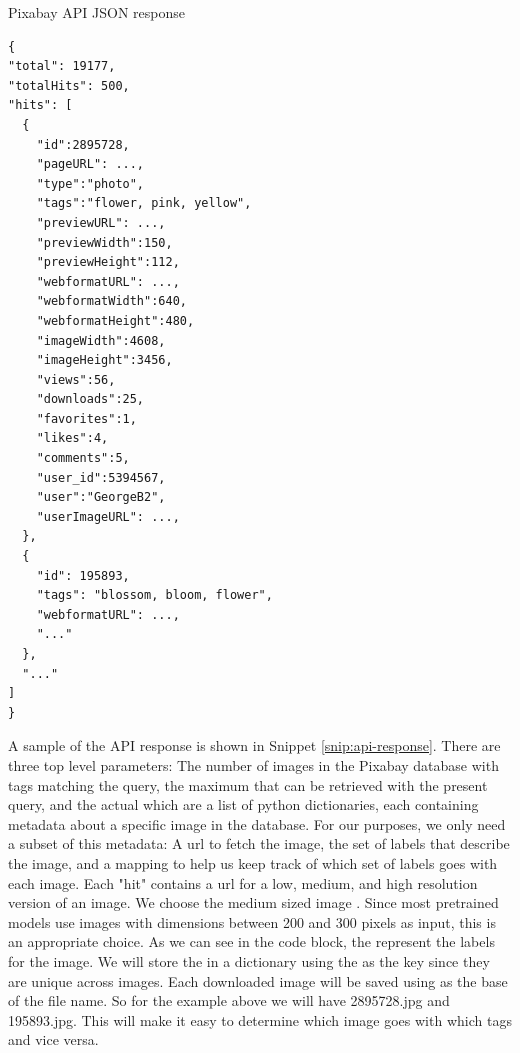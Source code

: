 \documentclass[10pt, a4paper, twocolumn]{article} %
\begin{document}
\begin{code}
\caption{Pixabay API JSON response}
\label{snip:api-response}
\begin{verbatim}
{
"total": 19177,
"totalHits": 500,
"hits": [
  {
    "id":2895728,
    "pageURL": ...,
    "type":"photo",
    "tags":"flower, pink, yellow",
    "previewURL": ...,
    "previewWidth":150,
    "previewHeight":112,
    "webformatURL": ...,
    "webformatWidth":640,
    "webformatHeight":480,
    "imageWidth":4608,
    "imageHeight":3456,
    "views":56,
    "downloads":25,
    "favorites":1,
    "likes":4,
    "comments":5,
    "user_id":5394567,
    "user":"GeorgeB2",
    "userImageURL": ...,
  },
  {
    "id": 195893,
    "tags": "blossom, bloom, flower",
    "webformatURL": ...,
    "..."
  },
  "..."
]
}
\end{verbatim}
\end{code}
\vspace{1mm}

A sample of the API response is shown in Snippet \ref{snip:api-response}.  There are three top level parameters: The  number of images in the Pixabay database with tags matching the query, the maximum  that can be retrieved with the present query, and the actual  which are a list of python dictionaries, each containing metadata about a specific image in the database.  For our purposes, we only need a subset of this metadata:  A url to fetch the image, the set of labels that describe the image, and a mapping to help us keep track of which set of labels goes with each image.  Each "hit" contains a url for a low, medium, and high resolution version of an image. We choose the medium sized image . Since most pretrained models use images with dimensions between 200 and 300 pixels as input, this is an appropriate choice. As we can see in the code block, the  represent the labels for the image.  We will store the  in a dictionary using the  as the key since they are unique across images. Each downloaded image will be saved using  as the base of the file name.  So for the example above we will have 2895728.jpg and 195893.jpg.  This will make it easy to determine which image goes with which tags and vice versa.
\end{document}
